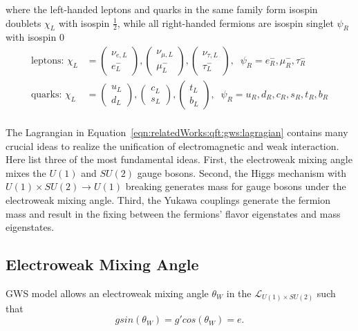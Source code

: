 \noindent where the left-handed leptons and quarks in the same family form isospin doublets $\chi_L$  with isospin $\frac{1}{2}$, while all right-handed fermions are isospin singlet $\psi_R$ with isospin 0
\begin{equation}
\begin{split}
    \text{leptons: }
    \chi_L &= 
    \begin{pmatrix} \nu_{e,L} \\ e^-_{L} \end{pmatrix}, 
    \begin{pmatrix} \nu_{\mu,L} \\ \mu^-_{L} \end{pmatrix},
    \begin{pmatrix} \nu_{\tau,L} \\ \tau^-_{L} \end{pmatrix}, 
    \;\; \psi_R  = e^-_R, \mu^-_R, \tau^-_R \\
    \text{quarks: }
    \chi_L &= 
    \begin{pmatrix} u_{L} \\ d_{L} \end{pmatrix}, 
    \begin{pmatrix} c_{L} \\ s_{L} \end{pmatrix},
    \begin{pmatrix} t_{L} \\ b_{L} \end{pmatrix}, 
    \;\; \psi_R = u_R, d_R, c_R, s_R, t_R, b_R \\
\end{split}
\end{equation}

\noindent The Lagrangian in Equation~\ref{eqn:relatedWorks:qft:gws:lagragian} contains many crucial ideas to realize the unification of electromagnetic and weak interaction. Here list three of the most fundamental ideas. First, the electroweak mixing angle mixes the $U(1)$ and $SU(2)$ gauge bosons. Second, the Higgs mechanism with $U(1)\times SU(2)\to U(1)$ breaking generates mass for gauge bosons under the electroweak mixing angle. Third, the Yukawa couplings generate the fermion mass and result in the fixing between the fermions' flavor eigenstates and mass eigenstates.


\subsection{Electroweak Mixing Angle}
GWS model allows an electroweak mixing angle $\theta_W$  in the $\mathcal{L}_{U(1)\times SU(2)}$ such that 
\begin{equation}
    g sin(\theta_W) = g' cos(\theta_W) = e.
\end{equation}

